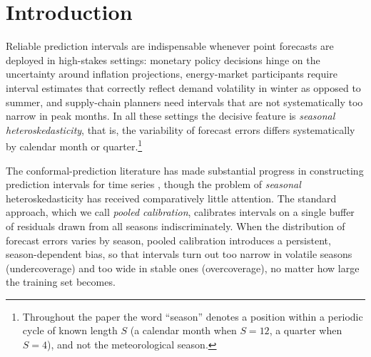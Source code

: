 \section{Introduction}
\label{sec:introduction}

Reliable prediction intervals are indispensable whenever point
forecasts are deployed in high-stakes settings: monetary policy
decisions hinge on the uncertainty around inflation projections,
energy-market participants require interval estimates that correctly
reflect demand volatility in winter as opposed to summer, and
supply-chain planners need intervals that are not systematically too
narrow in peak months.  In all these settings the decisive feature is
\emph{seasonal heteroskedasticity}, that is, the variability of
forecast errors differs systematically by calendar month or
quarter.\footnote{Throughout the paper the word ``season'' denotes a
position within a periodic cycle of known length $S$ (a calendar
month when $S = 12$, a quarter when $S = 4$), and not the
meteorological season.}

The conformal-prediction literature has made substantial progress in
constructing prediction intervals for time series
\citep{xu2023conformal, xu2023sequential, barber2023conformal},
though the problem of \emph{seasonal} heteroskedasticity has received
comparatively little attention.  The standard approach, which we call
\emph{pooled calibration}, calibrates intervals on a single buffer of
residuals drawn from all seasons indiscriminately.  When the
distribution of forecast errors varies by season, pooled calibration
introduces a persistent, season-dependent bias, so that intervals
turn out too narrow in volatile seasons (undercoverage) and too wide
in stable ones (overcoverage), no matter how large the training set
becomes.

